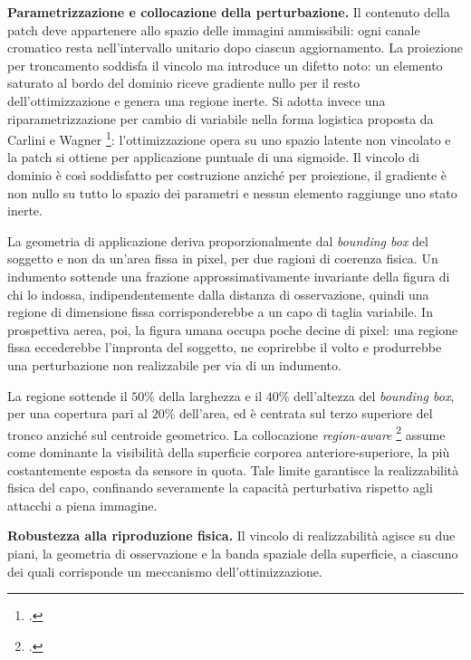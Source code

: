 \documentclass[a4paper,12pt]{report}
\begin{document}
\textbf{Parametrizzazione e collocazione della perturbazione.}
\label{sec:sigmoide}
\label{sec:collocazione}
Il contenuto della patch deve appartenere allo spazio delle immagini
ammissibili: ogni canale cromatico resta nell'intervallo unitario dopo ciascun
aggiornamento. La proiezione per troncamento soddisfa il vincolo ma introduce un
difetto noto: un elemento saturato al bordo del dominio riceve gradiente nullo
per il resto dell'ottimizzazione e genera una regione inerte. Si adotta invece
una riparametrizzazione per cambio di variabile nella forma logistica proposta
da Carlini e Wagner \footcite{carlini_2017}: l'ottimizzazione opera su uno spazio
latente non vincolato e la patch si ottiene per applicazione puntuale di una
sigmoide. Il vincolo di dominio è così soddisfatto per costruzione anziché per
proiezione, il gradiente è non nullo su tutto lo spazio dei parametri e nessun
elemento raggiunge uno stato inerte.

La geometria di applicazione deriva proporzionalmente dal \textit{bounding box}
del soggetto e non da un'area fissa in pixel, per due ragioni di coerenza
fisica. Un indumento sottende una frazione approssimativamente invariante della
figura di chi lo indossa, indipendentemente dalla distanza di osservazione,
quindi una regione di dimensione fissa corrisponderebbe a un capo di taglia
variabile. In prospettiva aerea, poi, la figura umana occupa poche decine di
pixel: una regione fissa eccederebbe l'impronta del soggetto, ne coprirebbe il
volto e produrrebbe una perturbazione non realizzabile per via di un indumento.

La regione sottende il $50\%$ della larghezza e il $40\%$ dell'altezza del
\textit{bounding box}, per una copertura pari al $20\%$ dell'area, ed è centrata
sul terzo superiore del tronco anziché sul centroide geometrico. La collocazione
\textit{region-aware} \footcite{huang_2020_upc} assume come dominante la
visibilità della superficie corporea anteriore-superiore, la più costantemente
esposta da sensore in quota. Tale limite garantisce la realizzabilità fisica del
capo, confinando severamente la capacità perturbativa rispetto agli attacchi a
piena immagine.

\textbf{Robustezza alla riproduzione fisica.}
\label{sec:eot}
\label{sec:tv}
Il vincolo di realizzabilità agisce su due piani, la geometria di osservazione e
la banda spaziale della superficie, a ciascuno dei quali corrisponde un
meccanismo dell'ottimizzazione.
\end{document}
